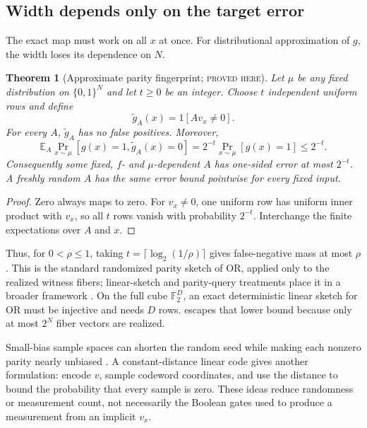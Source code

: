 \documentclass[11pt]{article}
\newtheorem{theorem}{Theorem}[section]
\theoremstyle{definition}
\theoremstyle{remark}
\newcommand{\bits}{\{0,1\}}
\newcommand{\F}{\mathbb F}
\newcommand{\status}[1]{\textsc{#1}}
\begin{document}
\subsection{Width depends only on the target error}

The exact map must work on all $x$ at once.  For distributional approximation
of $g$, the width loses its dependence on $N$.

\begin{theorem}[Approximate parity fingerprint; \status{proved here}]
\label{thm:approx-fingerprint}
Let $\mu$ be any fixed distribution on $\bits^N$ and let $t\ge0$ be an
integer.  Choose $t$ independent uniform rows and define
\[
  \widetilde g_A(x)=1[Av_x\ne0].
\]
For every $A$, $\widetilde g_A$ has no false positives.  Moreover,
\[
  \mathbb E_A\Pr_{x\sim\mu}
  [g(x)=1,\widetilde g_A(x)=0]
  =2^{-t}\Pr_{x\sim\mu}[g(x)=1]
  \le2^{-t}.
  \tag{4.6}\label{eq:approx-fingerprint}
\]
Consequently some fixed, $f$- and $\mu$-dependent $A$ has one-sided error at
most $2^{-t}$.  A freshly random $A$ has the same error bound pointwise for
every fixed input.
\end{theorem}

\begin{proof}
Zero always maps to zero.  For $v_x\ne0$, one uniform row has uniform inner
product with $v_x$, so all $t$ rows vanish with probability $2^{-t}$.
Interchange the finite expectations over $A$ and $x$.
\end{proof}

Thus, for $0<\rho\le1$, taking
$t=\lceil\log_2(1/\rho)\rceil$ gives false-negative mass at most $\rho$.
This is the standard randomized parity sketch of OR, applied only to the
realized witness fibers; linear-sketch and parity-query treatments place it
in a broader framework \cite{KannanEtAl2018,Gavinsky2025}.  On the full cube
$\F_2^D$, an exact deterministic linear sketch for OR must be injective and
needs $D$ rows.   escapes that lower bound because
only at most $2^N$ fiber vectors are realized.

Small-bias sample spaces can shorten the random seed while making each
nonzero parity nearly unbiased \cite{NaorNaor1993}.  A constant-distance
linear code gives another formulation: encode $v$, sample codeword
coordinates, and use the distance to bound the probability that every sample
is zero.  These ideas reduce randomness or measurement count, not necessarily
the Boolean gates used to produce a measurement from an implicit $v_x$.
\end{document}
